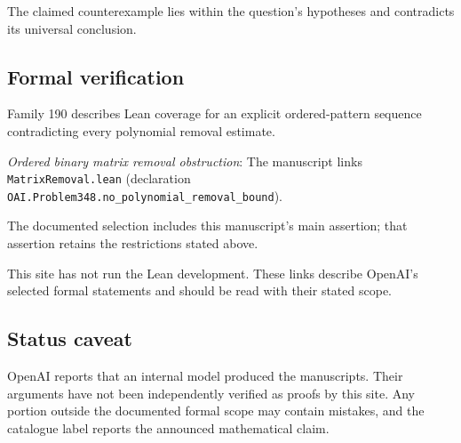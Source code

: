 \documentclass[11pt]{article}
\begin{document}
The claimed counterexample lies within the question’s hypotheses and contradicts its universal conclusion.

\subsection{Formal verification}
Family 190 describes Lean coverage for an explicit ordered-pattern sequence contradicting every polynomial removal estimate.

\textit{Ordered binary matrix removal obstruction}: The manuscript links \texttt{MatrixRemoval.lean} (declaration \texttt{OAI.Problem348.no\_polynomial\_removal\_bound}).

The documented selection includes this manuscript’s main assertion; that assertion retains the restrictions stated above.

This site has not run the Lean development. These links describe OpenAI’s selected formal statements and should be read with their stated scope.

\subsection{Status caveat}
OpenAI reports that an internal model produced the manuscripts. Their arguments have not been independently verified as proofs by this site. Any portion outside the documented formal scope may contain mistakes, and the catalogue label reports the announced mathematical claim.
\end{document}
